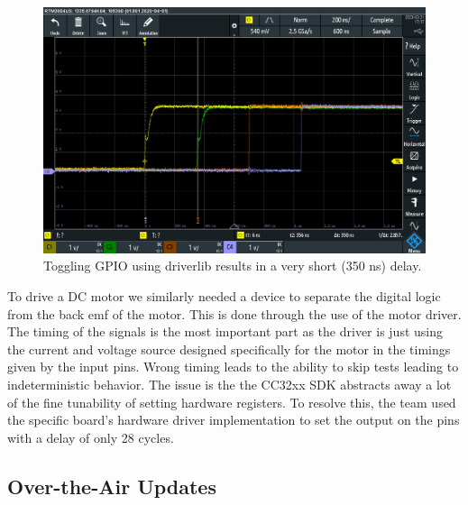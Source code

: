 \documentclass[journal]{IEEEtran}
\begin{document}
\begin{figure}[H]
	\centering
	\label{fig:gpio_toggle_driverlib}
	\includegraphics[width=\linewidth]{images/gpio_toggle_driverlib.jpg}
	\caption{Toggling GPIO using driverlib results in a very short (350 ns) delay.}
\end{figure}
To drive a DC motor we similarly needed a device to separate the digital logic from the back emf of the motor. 
This is done through the use of the motor driver. The timing of the signals is the most important part as the 
driver is just using the current and voltage source designed specifically for the motor in the timings given by 
the input pins. Wrong timing leads to the ability to skip tests leading to indeterministic behavior. The issue 
is the the CC32xx SDK abstracts away a lot of the fine tunability of setting hardware registers. To resolve this, 
the team used the specific board's hardware driver implementation to set the output on the pins with a delay of only 28 cycles.
\subsection{Over-the-Air Updates}
\end{document}
